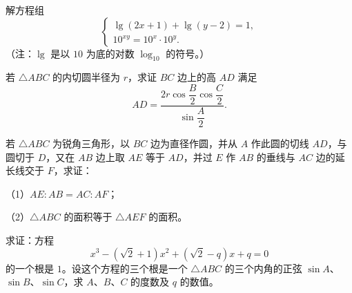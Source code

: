 \begin{question}
解方程组
\[
\begin{cases}
\lg(2x+1)+\lg(y-2)=1,\\
10^{xy}=10^x\cdot10^y.
\end{cases}
\]
（注：$\lg$ 是以 $10$ 为底的对数 $\log_{10}$ 的符号。）

\end{question}
\begin{question}
若 $\triangle ABC$ 的内切圆半径为 $r$，求证 $BC$ 边上的高 $AD$ 满足
\[
AD=\frac{2r\cos\dfrac B2\cos\dfrac C2}{\sin\dfrac A2}.
\]

\end{question}
\begin{question}
若 $\triangle ABC$ 为锐角三角形，以 $BC$ 边为直径作圆，并从 $A$ 作此圆的切线 $AD$，与圆切于 $D$，又在 $AB$ 边上取 $AE$ 等于 $AD$，并过 $E$ 作 $AB$ 的垂线与 $AC$ 边的延长线交于 $F$，求证：

（1）$AE:AB=AC:AF$；

（2）$\triangle ABC$ 的面积等于 $\triangle AEF$ 的面积。

\end{question}
\begin{question}
求证：方程
\[
x^3-(\sqrt2+1)x^2+(\sqrt2-q)x+q=0
\]
的一个根是 $1$。设这个方程的三个根是一个 $\triangle ABC$ 的三个内角的正弦 $\sin A$、$\sin B$、$\sin C$，求 $A$、$B$、$C$ 的度数及 $q$ 的数值。

\end{question}